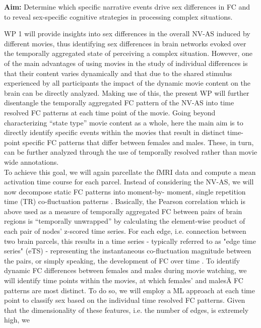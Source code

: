 \documentclass[11pt,a4paper]{article}
\begin{document}
\textbf{Aim:} Determine which specific narrative events drive sex differences in FC
and to reveal sex-specific cognitive strategies in processing complex situations.

WP 1 will provide insights into sex differences in the overall NV-AS induced by different movies, thus
identifying sex differences in brain networks evoked over the temporally aggregated state of perceiving a
complex situation. However, one of the main advantages of using movies in the study of individual
differences is that their content varies dynamically and that due to the shared stimulus experienced by all
participants the impact of the dynamic movie content on the brain can be directly analyzed. Making use
of this, the present WP will further disentangle the temporally aggregated FC pattern of the NV-AS into
time resolved FC patterns at each time point of the movie. Going beyond characterizing “state type” movie
content as a whole, here the main aim is to directly identify specific events within the movies that result in
distinct time-point specific FC patterns that differ between females and males. These, in turn, can be further
analyzed through the use of temporally resolved rather than movie wide annotations.\\
To achieve this goal, we will again parcellate the fMRI data and compute a mean activation time course for
each parcel. Instead of considering the NV-AS, we will now decompose static FC patterns into moment-by-
moment, single repetition time (TR) co-fluctuation patterns \parencite{betzelLivingEdgeNetwork2023a,faskowitzEdgecentricFunctionalNetwork2020a}.
Basically, the Pearson correlation which is above used as a measure of temporally aggregated FC between
pairs of brain regions is “temporally unwrapped” by calculating the element-wise product of each pair of
nodes' z-scored time series. For each edge, i.e. connection between two brain parcels, this results in a time
series - typically referred to as "edge time series" (eTS) - representing the instantaneous co-fluctuation
magnitude between the pairs, or simply speaking, the development of FC over time \parencite{betzelLivingEdgeNetwork2023a}.
To identify dynamic FC differences between females and males during movie watching, we will identify
time points within the movies, at which females' and malesÄ FC patterns are most distinct. To do so, we
will employ a ML approach at each time point to classify sex based on the individual time resolved FC
patterns. Given that the dimensionality of these features, i.e. the number of edges, is extremely high, we
\end{document}
